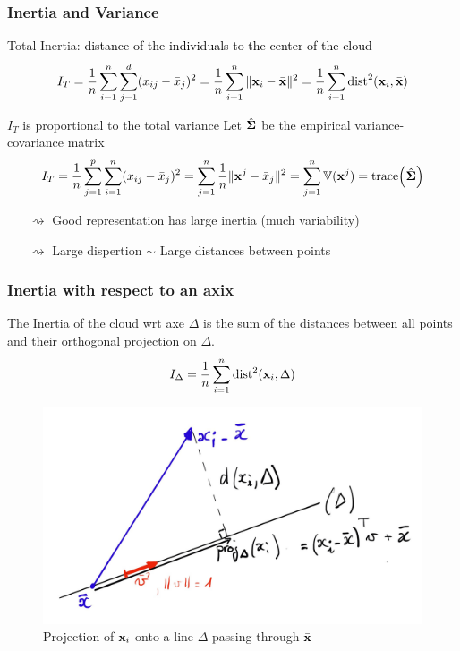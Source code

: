 \documentclass{beamer}\usepackage[]{graphicx}\usepackage[]{color}
\begin{document}
\begin{frame}
  \frametitle{Inertia and Variance}

\begin{block}{Total Inertia: \textcolor{black}{distance of the individuals to the center of the cloud}}
  \[
      I_T = \frac{1}{n}\sum_{i=1}^n \sum_{j=1}^d  (x_{ij}- \bar{x}_{j}) ^2 
      = \frac{1}{n}\sum_{i=1}^n \|\mathbf{x}_i - \bar{\mathbf{x}} \|^2  
      = \frac{1}{n}\sum_{i=1}^n \text{dist}^2 (\mathbf{x}_i,\bar{\mathbf{x}})
    \]
\end{block}

  \begin{block}{$I_T$ is proportional to the total variance}
  Let $\hat{\boldsymbol{\Sigma}}$ be the empirical variance-covariance matrix
\[
      I_T = \frac{1}{n}\sum_{j=1}^p  \sum_{i=1}^n (x_{ij}- \bar{x}_{j}) ^2 
      = \sum_{j=1}^n \frac{1}{n}\|\mathbf{x}^j - \bar{x}_{j} \|^2
      = \sum_{j=1}^n \mathbb{V}(\mathbf{x}^j) = \mathrm{trace}{\left(\hat{\boldsymbol{\Sigma}}\right)}
\]
\end{block}

\begin{itemize}
  \item[$\rightsquigarrow$] \alert{Good representation has large inertia} (much variability)
  \item[$\rightsquigarrow$] \alert{Large dispertion $\sim$ Large distances between points}
\end{itemize}
  
\end{frame}

\begin{frame}
  \frametitle{Inertia with respect to an axix}

  The Inertia of the cloud wrt axe $\Delta$ is the sum of the distances between all points and their orthogonal projection on $\Delta$.
  \begin{equation*}
    \begin{aligned}
      I_\Delta = \frac{1}{n}\sum_{i=1}^n \text{dist}^2(\mathbf{x}_i, \Delta)
      \end{aligned}
  \end{equation*}

  \begin{figure}
    \includegraphics[width=.7\textwidth]{proj_axis}
    \caption{Projection of $\mathbf{x}_i$ onto a line $\Delta$ passing through $\bar{\mathbf{x}}$}
  \end{figure}

\end{frame}
\end{document}

